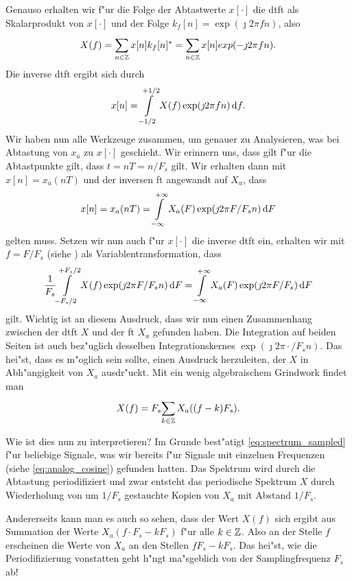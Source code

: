 Genauso erhalten wir f"ur die Folge der Abtastwerte $x[\cdot]$ die \gls{dtft} als Skalarprodukt von $x[\cdot]$ und der Folge $k_f[n] = \exp(\jmath 2 \pi f n)$, also
%
\begin{equation}\label{eq:dtft_inner_prod}
    X(f) = {\sum\limits_{n \in \mathbb{Z}}^{}{
            x[n] k_f[n]^\ast
        }}
        = {\sum\limits_{n \in \mathbb{Z}}^{}{
            x[n] exp(-\jmath 2 \pi f n)
        }}.
\end{equation}
%
Die inverse \gls{dtft} ergibt sich durch
\[
x[n] = {\int\limits_{-1/2}^{+1/2}{X(f) \exp(\jmath 2 \pi f n)}\,\mathrm{d}{f}}.
\]
Wir haben nun alle Werkzeuge zusammen, um genauer zu Analysieren, was bei Abtastung von $x_a$ zu $x[\cdot]$ geschieht.
Wir erinnern uns, dass gilt f"ur die Abtastpunkte gilt, dass $t = nT = n/F_s$ gilt.
Wir erhalten dann mit $x[n] = x_a(nT)$ und der inversen \gls{ft} angewandt auf $X_a$, dass
\[
x[n] = x_a(nT) = {\int\limits_{-\infty}^{+\infty}{X_a(F) \exp(\jmath 2 \pi F/F_s n)}\,\mathrm{d}{F}}
\]
gelten muss.
Setzen wir nun auch f"ur $x[\cdot]$ die inverse \gls{dtft} ein, erhalten wir mit $f = F/F_s$ (siehe ) als Variablentransformation, dass
\[
    \frac{1}{F_s} {\int\limits_{-{F_s}/2}^{+{F_s}/2}{X(f) \exp(\jmath 2 \pi F/F_s n)}\,\mathrm{d}{F}}
    = {\int\limits_{-\infty}^{+\infty}{X_a(F) \exp(\jmath 2 \pi F/F_s)}\,\mathrm{d}{F}}
\]
gilt. 
Wichtig ist an diesem Ausdruck, dass wir nun einen Zusammenhang zwischen der \gls{dtft} $X$ und der \gls{ft} $X_a$ gefunden haben.
Die Integration auf beiden Seiten ist auch bez"uglich desselben Integrationskernes $\exp(\jmath 2 \pi \cdot/F_s n)$.
Das hei"st, dass es m"oglich sein sollte, einen Ausdruck herzuleiten, der $X$ in Abh"angigkeit von $X_a$ ausdr"uckt.
Mit ein wenig algebraischem Grindwork findet man
\begin{equation}\label{eq:spectrum_sampled}
    X(f) = F_s {\sum\limits_{k \in \mathbb{Z}}^{}{
        X_a((f - k) F_s)
    }}.
\end{equation}

Wie ist dies nun zu interpretieren? 
Im Grunde best"atigt \eqref{eq:spectrum_sampled} f"ur beliebige Signale, was wir bereits f"ur Signale mit einzelnen Frequenzen (siehe \eqref{eq:analog_cosine}) gefunden hatten.
Das Spektrum wird durch die Abtastung periodifiziert und zwar entsteht das periodische Spektrum $X$ durch Wiederholung von um $1/F_s$ gestauchte Kopien von $X_a$ mit Abstand $1/F_s$.

Andererseits kann man es auch so sehen, dass der Wert $X(f)$ sich ergibt aus Summation der Werte $X_a(f \cdot F_s - k F_s)$ f"ur alle $k \in \mathbb{Z}$. 
Also an der Stelle $f$ erscheinen die Werte von $X_a$ an den Stellen $f F_s - k F_s$.
Das hei"st, wie die Periodifizierung vonstatten geht h"ngt ma"sgeblich von der Samplingfrequenz $F_s$ ab!

